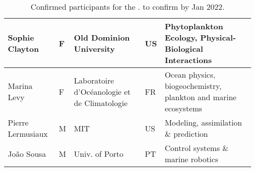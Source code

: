 \begin{table}[H]
{\begin{tabular}{|p{3.5cm}|p{0.7cm}|p{4.0cm}|p{0.5cm}|p{6.0cm}|}
  \hline
  Sophie Clayton           & F   & Old Dominion University              & US       & Phytoplankton Ecology, Physical-Biological Interactions\\
  \hline
  Marina Levy              & F   & Laboratoire d'Oc\'{e}anologie et de Climatologie    & FR       & Ocean physics, biogeochemistry, plankton and marine ecosystems\\
  \hline
  Pierre Lermusiaux        & M   & MIT & US       &Modeling, assimilation \& prediction\\
  \hline
  Jo\~ao Sousa               & M   & Univ. of Porto & PT       &
                                                                 Control systems \& marine robotics\\
                                                                 \hline
\end{tabular}
}
\caption{Confirmed participants for the \sympe. \kc{\textsuperscript{*}} to confirm by Jan 2022.}
\label{tab:part}
\end{table}
